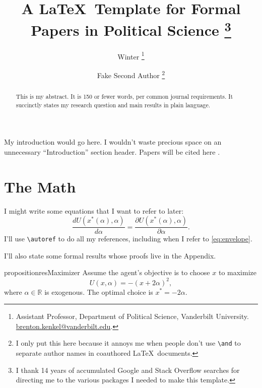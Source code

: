 \documentclass[12pt]{article}
\title{A \LaTeX\ Template for Formal Papers in Political Science%
  \thanks{I thank 14 years of accumulated Google and Stack Overflow searches for directing me to the various packages I needed to make this template.}
}
\author{Winter%
  \thanks{Assistant Professor, Department of Political Science, Vanderbilt University. \url{brenton.kenkel@vanderbilt.edu}.}
  \and Fake Second Author%
  \thanks{I only put this here because it annoys me when people don't use \texttt{\textbackslash{}and} to separate author names in coauthored \LaTeX\ documents.}
}
\begin{document}

\setcounter{page}{0}
\maketitle
\thispagestyle{empty}

\begin{abstract}
  This is my abstract.
  It is 150 or fewer words, per common journal requirements.
  It succinctly states my research question and main results in plain language.
\end{abstract}


\clearpage
\doublespacing

My introduction would go here.
I wouldn't waste precious space on an unnecessary ``Introduction'' section header.
Papers will be cited here \citep{walter1997critical}.

\section{The Math}

I might write some equations that I want to refer to later:
\begin{equation}
  \label{eq:envelope}
  \frac{d U(x^*(\alpha), \alpha)}{d \alpha} = \frac{\partial U(x^*(\alpha), \alpha)}{\partial \alpha}.
\end{equation}
I'll use \verb|\autoref| to do all my references, including when I refer to \autoref{eq:envelope}.

I'll also state some formal results whose proofs live in the Appendix.

\begin{restatable}{proposition}{resMaximizer}
  \label{res:maximizer}
  Assume the agent's objective is to choose $x$ to maximize
  \begin{displaymath}
    U(x, \alpha) = - (x + 2 \alpha)^2,
  \end{displaymath}
  where $\alpha \in \mathbb{R}$ is exogenous.
  The optimal choice is $x^* = - 2 \alpha$.
\end{restatable}
\end{document}
